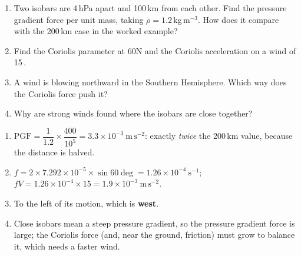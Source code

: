 \begin{tryit}
\begin{enumerate}[label=\textbf{\thechapter.\arabic*},leftmargin=*,itemsep=3pt]
\item Two isobars are 4\,hPa apart and 100\,km from each other. Find the pressure gradient force per unit mass, taking $\rho=1.2$\,kg\,m$^{-3}$. How does it compare with the 200\,km case in the worked example?
\item Find the Coriolis parameter at 60\deg N and the Coriolis acceleration on a wind of 15\,\ms.
\item A wind is blowing northward in the Southern Hemisphere. Which way does the Coriolis force push it?
\item Why are strong winds found where the isobars are close together?
\end{enumerate}
\end{tryit}

\begin{answerbox}
\begin{enumerate}[label=\textbf{\thechapter.\arabic*},leftmargin=*,itemsep=3pt]
\item $\mathrm{PGF}=\dfrac{1}{1.2}\times\dfrac{400}{10^{5}}=3.3\times10^{-3}\ \mathrm{m\,s^{-2}}$: exactly \emph{twice} the 200\,km value, because the distance is halved.
\item $f=2\times7.292\times10^{-5}\times\sin60\deg=1.26\times10^{-4}\ \mathrm{s^{-1}}$; $fV=1.26\times10^{-4}\times15=1.9\times10^{-3}\ \mathrm{m\,s^{-2}}$.
\item To the left of its motion, which is \textbf{west}.
\item Close isobars mean a steep pressure gradient, so the pressure gradient force is large; the Coriolis force (and, near the ground, friction) must grow to balance it, which needs a faster wind.
\end{enumerate}
\end{answerbox}
